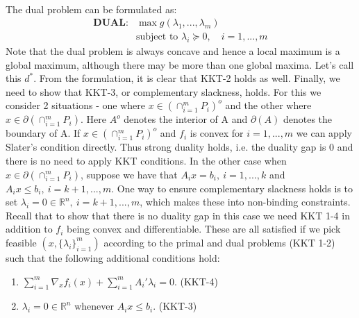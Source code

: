 \documentclass[12pt, leqno]{article}
\begin{document}
\paragraph{}The dual problem can be formulated as:
\begin{align*}
\textbf{DUAL:}&
\max g(\lambda_1,...,\lambda_m) \\
&\text{subject to } \lambda_i \succeq 0, \quad i = 1,...,m
\end{align*}
Note that the dual problem is always concave and hence a local
maximum is a global maximum, although there may be more than one
global maxima. Let's call this $d^*$. 
From the formulation, it is clear that KKT-2 holds as well. Finally, we need to show
that KKT-3, or complementary slackness, holds. For this we consider 2
situations - one where $x \in (\cap_{i=1}^m P_i)^o$ and the other where $x
\in \partial (\cap_{i=1}^m P_i )$. Here $A^o$ denotes the interior of
A and
$\partial(A)$ denotes the boundary of A.
If $x \in (\cap_{i=1}^m P_i)^o$ and $f_i$ is
convex for $i = 1,...,m$ we can apply Slater's condition
directly. Thus strong duality holds, i.e. the duality gap is 0 and
there is no need to apply KKT conditions. In the other case when $x
\in \partial (\cap_{i=1}^m P_i )$, suppose we have that $A_ix = b_i, ~  i =
1,...,k$ and $A_ix \leq b_i, ~  i =
k+1,...,m$. One way to ensure complementary slackness holds is to set
$\lambda_i = 0 \in \mathbb{R}^n, ~ i = k+1,...,m$, which
makes these into non-binding constraints. Recall that to show that there is
no duality gap in
this case we need KKT 1-4 in addition to $f_i$ being convex and
differentiable. These are all satisfied if we pick feasible
$(x,\{\lambda_i\}_{i=1}^m)$ according to the primal and dual problems
(KKT 1-2) such that the following additional
conditions hold: 
\begin{enumerate}
\item $\sum_{i=1}^m \nabla_x f_i(x) +
\sum_{i=1}^m A_i' \lambda_i {=} 0$. (KKT-4)
\item $\lambda_i = 0 \in \mathbb{R}^n$ whenever $A_ix \leq b_i$. (KKT-3)
\end{enumerate}
 
\end{document}
